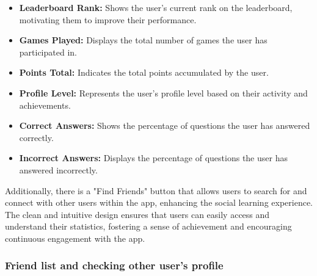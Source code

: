 \begin{itemize}
\item \textbf{Leaderboard Rank:} Shows the user's current rank on the leaderboard, motivating them to improve their performance.
\item \textbf{Games Played:} Displays the total number of games the user has participated in.
\item \textbf{Points Total:} Indicates the total points accumulated by the user.
\item \textbf{Profile Level:} Represents the user's profile level based on their activity and achievements.
\item \textbf{Correct Answers:} Shows the percentage of questions the user has answered correctly.
\item \textbf{Incorrect Answers:} Displays the percentage of questions the user has answered incorrectly.
\end{itemize}

Additionally, there is a "Find Friends" button that allows users to search for and connect with other users within the app, enhancing the social learning experience. The clean and intuitive design ensures that users can easily access and understand their statistics, fostering a sense of achievement and encouraging continuous engagement with the app.

\subsubsection{Friend list and checking other user's profile}

